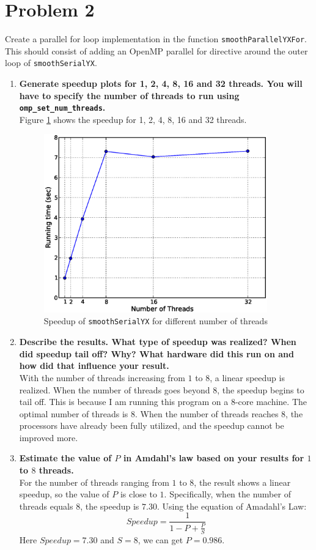 \documentclass[letterpaper, 11pt]{article}
\begin{document}
\section{Problem 2}
Create a parallel for loop implementation in the function \texttt{smoothParallelYXFor}. This should consist of adding an OpenMP parallel for directive around the outer loop of \texttt{smoothSerialYX}.
\begin{enumerate}
\item \textbf{Generate speedup plots for 1, 2, 4, 8, 16 and 32 threads. You will have to specify the number of threads to run using \texttt{omp\_set\_num\_threads}.}\\
Figure \ref{fig:yxspeedup} shows the speedup for 1, 2, 4, 8, 16 and 32 threads. 
\begin{figure}[h]
    \centering
    \includegraphics[width=3.8in]{yxparallelspeedup.eps}
    \caption{Speedup of \texttt{smoothSerialYX} for different number of threads}
    \label{fig:yxspeedup}
\end{figure}
\item \textbf{Describe the results. What type of speedup was realized? When did speedup tail off? Why? What hardware did this run on and how did that influence your result.}\\
With the number of threads increasing from $1$ to $8$, a linear speedup is realized. When the number of threads goes beyond $8$, the speedup begins to tail off. This is because I am running this program on a 8-core machine. The optimal number of threads is $8$. When the number of threads reaches $8$, the processors have already been fully utilized, and the speedup cannot be improved more. 

\item \textbf{Estimate the value of $P$ in Amdahl's law based on your results for $1$ to $8$ threads.}\\
For the number of threads ranging from $1$ to $8$, the result shows a linear speedup, so the value of $P$ is close to $1$. Specifically, when the number of threads equals $8$, the speedup is $7.30$. Using the equation of Amadahl's Law:\\
$$
    Speedup=\frac{1}{1-P+\frac{P}{S}}
$$
Here $Speedup=7.30$ and $S=8$, we can get $P=0.986$.
\end{enumerate}
\end{document}
